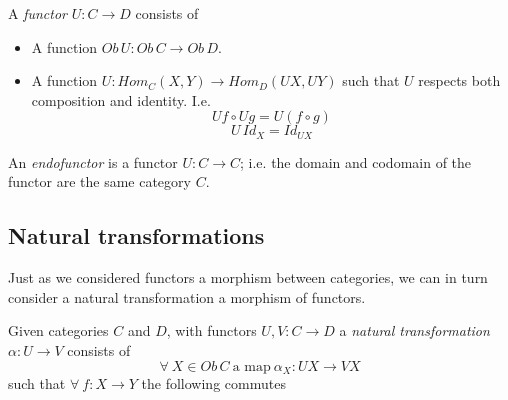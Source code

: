 \begin{definition}
    A \textit{functor} $U : C \rightarrow D$ consists of
    \begin{itemize}
        \item A function $Ob\,U : Ob\,C \rightarrow Ob\,D$.
        \item A function $U : Hom_C(X,Y) \rightarrow Hom_D(UX, UY)$
            such that $U$ respects both composition and identity.
            I.e.
            \begin{equation}
                Uf \circ Ug = U(f \circ g)
            \end{equation}
            \begin{equation}
                U\,Id_X = Id_{UX}
            \end{equation}
    \end{itemize}
\end{definition}

\begin{definition}
    An \textit{endofunctor} is a functor $U : C \rightarrow C$;
    i.e. the domain and codomain of the functor are the same category $C$.
\end{definition}

\subsection{Natural transformations}
Just as we considered functors a morphism between categories,
we can in turn consider a natural transformation a morphism of functors.\\

\begin{definition}
    Given categories $C$ and $D$,
    with functors $U, V : C \rightarrow D$
    a \textit{natural transformation} $\alpha : U \rightarrow V$
    consists of
    \begin{equation}
        \forall\ X \in Ob\,C\ \textrm{a map} \ \alpha_X : UX \rightarrow VX
    \end{equation}
    such that $\forall\ f : X \rightarrow Y$ the following commutes
    \begin{center}
    \end{center}
\end{definition}

